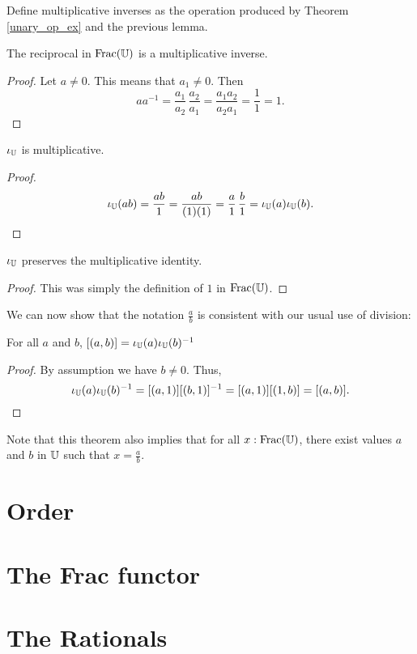 \documentclass[../../math.tex]{subfiles}
\begin{document}
\begin{definition}
    Define multiplicative inverses as the operation produced by Theorem
    \ref{unary_op_ex} and the previous lemma.
\end{definition}

\begin{instance}
    The reciprocal in $\operatorname{Frac}(\mathbb{U})$ is a multiplicative inverse.
\end{instance}
\begin{proof}
    Let $a \neq 0$.  This means that $a_1 \neq 0$.  Then
    \[
        a a^{-1} = \frac{a_1}{a_2} \, \frac{a_2}{a_1}
        = \frac{a_1a_2}{a_2a_1}
        = \frac{1}{1}
        = 1.
    \]
\end{proof}

\begin{instance}
    $\iota_{\mathbb{U}}$ is multiplicative.
\end{instance}
\begin{proof}
    \[
        \iota_{\mathbb{U}}(ab)
        = \frac{ab}{1}
        = \frac{ab}{(1)(1)}
        = \frac{a}{1} \, \frac{b}{1}
        = \iota_{\mathbb{U}}(a) \iota_{\mathbb{U}}(b).
    \]
\end{proof}

\begin{instance}
    $\iota_{\mathbb{U}}$ preserves the multiplicative identity.
\end{instance}
\begin{proof}
    This was simply the definition of $1$ in $\operatorname{Frac}(\mathbb{U})$.
\end{proof}

We can now show that the notation $\frac{a}{b}$ is consistent with our usual use
of division:

\begin{theorem}
    For all $a$ and $b$, $[(a, b)] = \iota_{\mathbb{U}}(a) \iota_{\mathbb{U}}(b)^{-1}$
\end{theorem}
\begin{proof}
    By assumption we have $b \neq 0$.  Thus,
    \[
        \iota_{\mathbb{U}}(a) \iota_{\mathbb{U}}(b)^{-1}
        = [(a, 1)] [(b, 1)]^{-1}
        = [(a, 1)] [(1, b)]
        = [(a, b)].
    \]
\end{proof}

Note that this theorem also implies that for all $x : \operatorname{Frac}(\mathbb{U})$, there exist
values $a$ and $b$ in $\mathbb{U}$ such that $x = \frac{a}{b}$.

\section{Order}

\section{The Frac functor}

\section{The Rationals}
\end{document}
